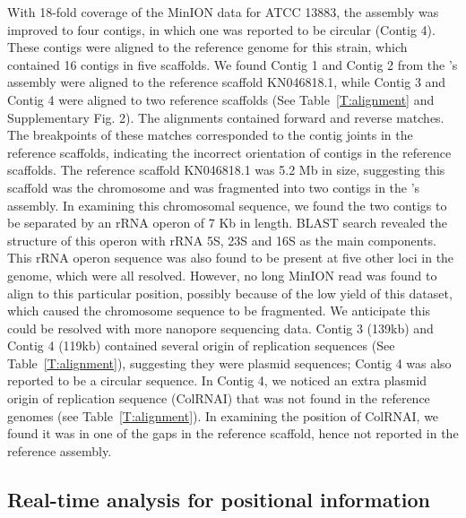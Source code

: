 With 18-fold coverage of the MinION data for \kp{} ATCC 13883, the
assembly was improved to four contigs, in which one was reported to be circular
(Contig 4). These contigs were aligned to the reference genome for this strain, 
which contained 16 contigs in five scaffolds. We found Contig 1 and Contig 2
from the \npscarf{}'s assembly were aligned to the reference scaffold KN046818.1,
while Contig 3 and Contig 4 were aligned to two reference scaffolds (See
Table~\ref{T:alignment} and Supplementary Fig. 2). The
alignments contained forward and reverse matches. The breakpoints of
these matches corresponded to the contig joints in the reference scaffolds,
indicating the incorrect orientation of contigs in the reference scaffolds. 
The reference scaffold KN046818.1 was 5.2 Mb in size, suggesting 
this scaffold was the
chromosome and was fragmented into two contigs in the \npscarf{}'s assembly. In
examining this chromosomal sequence, we found the two contigs to be separated by an 
rRNA operon of 7 Kb in length. BLAST search revealed the structure of this operon
with rRNA 5S, 23S and 16S as the main components. This rRNA operon sequence was
also found to be present at five other loci in the genome, which were all
resolved. However, no long MinION read was found to align to this
particular position, possibly because of the low yield of this dataset, which
caused the chromosome sequence to be fragmented. 
We anticipate this could be resolved with more nanopore sequencing data.
Contig 3 (139kb) and Contig 4 (119kb) contained several
origin of replication sequences (See Table~\ref{T:alignment}), suggesting they 
were plasmid sequences; Contig 4 was also reported to be a circular sequence.
In Contig 4, we noticed an extra plasmid origin of replication sequence (ColRNAI) that
was not found in the reference genomes (see Table~\ref{T:alignment}).
In examining the position of ColRNAI, we found it was
in one of the gaps in the reference scaffold, hence not reported in the
reference assembly.

\subsection{Real-time analysis for positional information}

